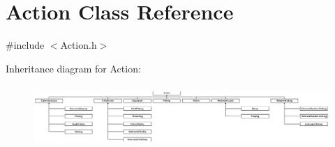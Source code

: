 \hypertarget{class_action}{}\section{Action Class Reference}
\label{class_action}


{\ttfamily \#include $<$Action.\+h$>$}

Inheritance diagram for Action\+:\begin{figure}[H]
\begin{center}
\leavevmode
\includegraphics[height=2.361446cm]{class_action}
\end{center}
\end{figure}
